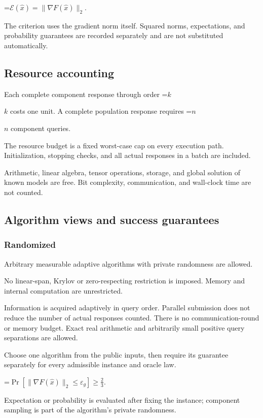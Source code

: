 \documentclass[10pt,a4paper]{article}
\newcommand{\AtlasMath}[1]{\par\begingroup\centering\setbox0=\hbox{$\displaystyle #1$}\ifdim\wd0>1.4\linewidth\typeout{ATLAS WIDE FORMULA: \the\wd0}\fi\ifdim\wd0>\linewidth\resizebox{\linewidth}{!}{\box0}\else\box0\fi\par\endgroup}
\newcommand{\AtlasInlineMath}[1]{\begingroup\setbox0=\hbox{$#1$}\ifdim\wd0>.4\linewidth\endgroup\AtlasMath{#1}\else\endgroup$#1$\fi}
\begin{document}
\AtlasMath{\mathcal{E}(\widehat{x})=\|\nabla F(\widehat{x})\|_2.}


The criterion uses the gradient norm itself. Squared norms, expectations, and probability guarantees are recorded separately and are not substituted automatically.

\subsection{Resource accounting}
Each complete component response through order \AtlasInlineMath{k} costs one unit. A complete population response requires \AtlasInlineMath{n} component queries.

The resource budget is a fixed worst-case cap on every execution path. Initialization, stopping checks, and all actual responses in a batch are included.

Arithmetic, linear algebra, tensor operations, storage, and global solution of known models are free. Bit complexity, communication, and wall-clock time are not counted.

\subsection{Algorithm views and success guarantees}
\subsubsection{Randomized}
Arbitrary measurable adaptive algorithms with private randomness are allowed.

No linear-span, Krylov or zero-respecting restriction is imposed. Memory and internal computation are unrestricted.

Information is acquired adaptively in query order. Parallel submission does not reduce the number of actual responses counted. There is no communication-round or memory budget. Exact real arithmetic and arbitrarily small positive query separations are allowed.

Choose one algorithm from the public inputs, then require its guarantee separately for every admissible instance and oracle law.


\AtlasMath{\Pr\!\left[\|\nabla F(\widehat{x})\|_2\le \varepsilon_g\right]\ge\frac23.}


Expectation or probability is evaluated after fixing the instance; component sampling is part of the algorithm's private randomness.
\end{document}
